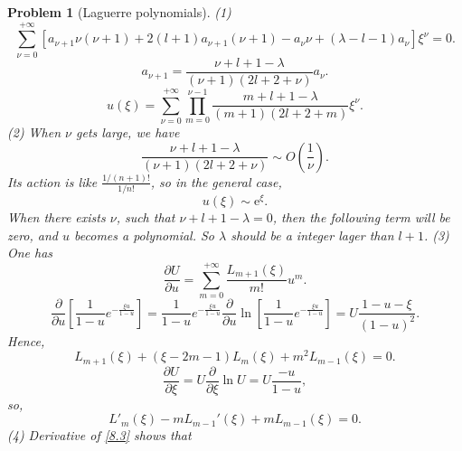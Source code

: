 \documentclass{article}
\theoremstyle{1}
\newtheorem{problem}{Problem}
\newcommand{\pa}{\partial}
\newcommand{\ee}{\mathrm{e}}
\begin{document}
\begin{problem}[Laguerre polynomials]
    (1) 
    \begin{equation}
        \sum_{\nu=0}^{+\infty} \left[ a_{\nu+1}\nu(\nu+1) +2(l+1)a_{\nu+1}(\nu+1)-a_{\nu}\nu+\left(\lambda-l-1\right)a_{\nu} \right]\xi^{\nu}=0.
    \end{equation}
    \begin{equation}
        a_{\nu+1}=\frac{\nu+l+1-\lambda}{(\nu+1)(2l+2+\nu)}a_{\nu}.
    \end{equation}
    \begin{equation}
        u(\xi)=\sum_{\nu=0}^{+\infty}\prod_{m=0}^{\nu-1}\frac{m+l+1-\lambda}{(m+1)(2l+2+m)}\xi^\nu.
    \end{equation}
    (2) When $\nu$ gets large, we have
    \begin{equation}
        \frac{\nu+l+1-\lambda}{(\nu+1)(2l+2+\nu)}\sim O(\frac{1}{\nu}).
    \end{equation}
    Its action is like $\frac{1/(n+1)!}{1/n!}$, so in the general case,
    \begin{equation}
        u(\xi)\sim \ee^\xi.
    \end{equation}
    When there exists $\nu$, such that $\nu+l+1-\lambda=0$, then the following term will be zero, and $u$ becomes a polynomial. So $\lambda$ should be a integer lager than $l+1$.
    (3) One has 
    \begin{equation}
        \frac{\pa U}{\pa u}=\sum_{m=0}^{+\infty}\frac{L_{m+1}(\xi)}{m!}u ^m.
    \end{equation}
    \begin{equation}
        \frac{\pa}{\pa u}\left[\frac{1}{1-u}e^{-\frac{\xi u}{1-u}}\right]=\frac{1}{1-u}e^{-\frac{\xi u}{1-u}}\frac{\pa}{\pa u}\ln\left[\frac{1}{1-u}e^{-\frac{\xi u}{1-u}}\right]=U\frac{1-u-\xi}{(1-u)^2}.
    \end{equation}
    Hence,
    \begin{equation}\label{8.3}
        L_{m+1}(\xi)+\left(\xi-2m-1\right)L_m(\xi)+m^2L_{m-1}(\xi)=0.
    \end{equation}
    \begin{equation}
        \frac{\pa U}{\pa \xi}=U\frac{\pa}{\pa \xi}\ln U=U\frac{-u}{1-u},
    \end{equation}
    so,
    \begin{equation}\label{8.5}
        L'_m(\xi)-mL_{m-1}'(\xi)+mL_{m-1}(\xi)=0.
    \end{equation}
    (4) Derivative of \eqref{8.3} shows that 
    \begin{equation}

\end{equation}
\end{problem}
\end{document}
